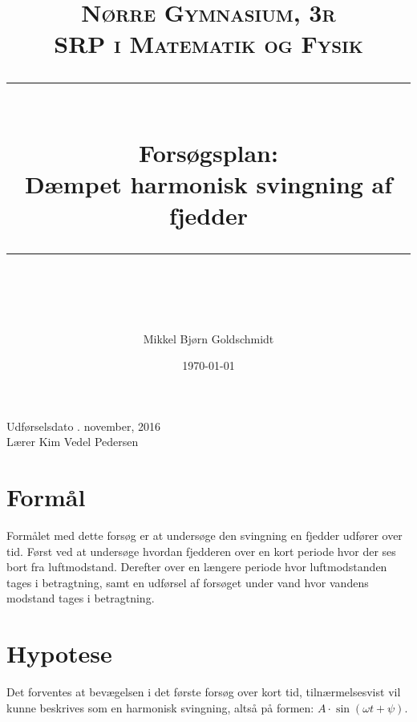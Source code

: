\documentclass{article} %
\title{
\normalfont \normalsize 
\textsc{Nørre Gymnasium, 3r\\ SRP i Matematik og Fysik} \\
[10pt] 
\rule{\linewidth}{0.5pt} \\[6pt] 
\huge Forsøgsplan:\\Dæmpet harmonisk svingning af fjedder \\
\rule{\linewidth}{2pt}  \\[10pt]
}
\author{Mikkel Bjørn Goldschmidt}
\date{\normalsize \today}
\begin{document}
\maketitle
\noindent
Udførselsdato . november, 2016 \\
Lærer \dotfill Kim Vedel Pedersen \\



%
%
%
%





\section{Formål}

Formålet med dette forsøg er at undersøge den svingning en fjedder udfører over tid. Først ved at undersøge hvordan fjedderen over en kort periode hvor der ses bort fra luftmodstand. Derefter over en længere periode hvor luftmodstanden tages i betragtning, samt en udførsel af forsøget under vand hvor vandens modstand tages i betragtning.



\section{Hypotese}
Det forventes at bevægelsen i det første forsøg over kort tid, tilnærmelsesvist vil kunne beskrives som en harmonisk svingning, altså på formen: $A\cdot \sin(\omega t + \psi)$.
\end{document}
